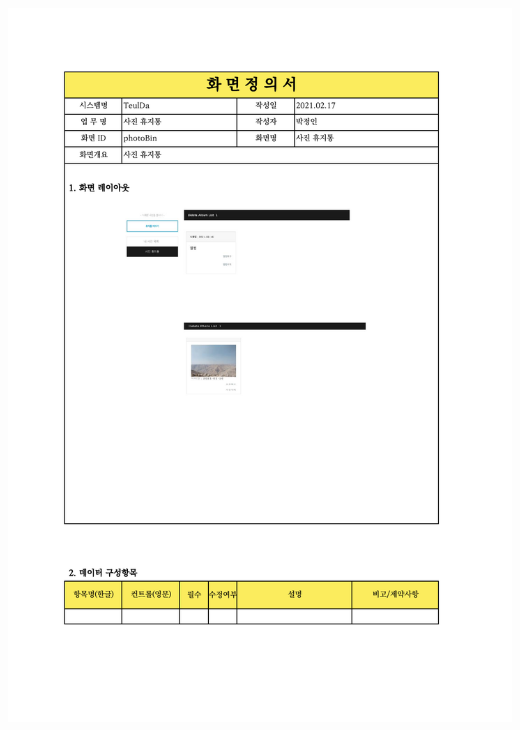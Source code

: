 {{{{{{{{{{{{{{{{{{{{{{{{{{{{{{{{{{{{{{{{{{{{{{{{{\includegraphics[width=20cm]{./Figure/Design/Display/photo/photo_05.pdf} \\
}}}}}}}}}}}}}}}}}}}}}}}}}}}}}}}}}}}}}}}}}}}}}}}}}
